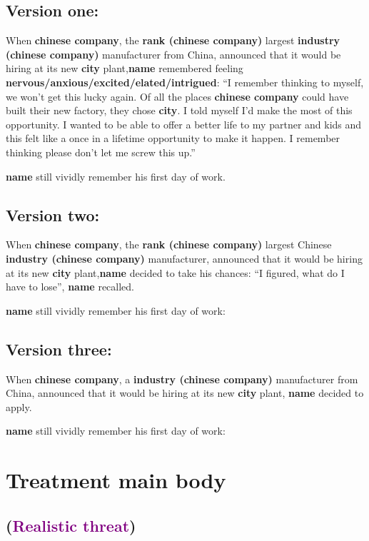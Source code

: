 \documentclass[12pt]{article}
\begin{document}
\subsection{Version one:}

When \textbf{chinese company}, the \textbf{rank (chinese company)} largest \textbf{industry (chinese company)} manufacturer from China, announced that it would be hiring at its new \textbf{city} plant,\textbf{name} remembered feeling \textbf{nervous/anxious/excited/elated/intrigued}: ``I remember thinking to myself, we won't get this lucky again. Of all the places \textbf{chinese company} could have built their new factory, they chose \textbf{city}. I told myself I'd make the most of this opportunity. I wanted to be able to offer a better life to my partner and kids and this felt like a once in a lifetime opportunity to make it happen. I remember thinking please don't let me screw this up.''

\textbf{name} still vividly remember his first day of work.

\subsection{Version two:}

When \textbf{chinese company}, the \textbf{rank (chinese company)} largest Chinese \textbf{industry (chinese company)} manufacturer, announced that it would be hiring at its new \textbf{city} plant,\textbf{name} decided to take his chances: ``I figured, what do I have to lose'', \textbf{name} recalled.

\textbf{name} still vividly remember his first day of work:

\subsection{Version three:}

When \textbf{chinese company}, a \textbf{industry (chinese company)} manufacturer from China, announced that it would be hiring at its new \textbf{city} plant, \textbf{name} decided to apply.

\textbf{name} still vividly remember his first day of work:

\section{Treatment main body}

\subsection{(\textcolor{purple}{Realistic threat})}
\end{document}
